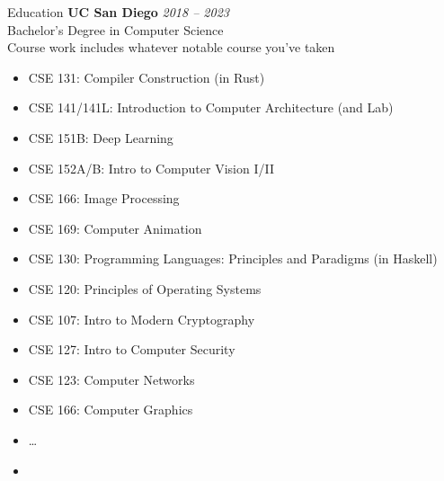 

	\begin{rSection}{Education}
		{\bf UC San Diego} \hfill {\em 2018 -- 2023} 
		\\ Bachelor's Degree in Computer Science %
		\\ Course work includes whatever notable course you've taken
		\begin{multicols}{2}
			\begin{itemize}
				\item CSE 131: Compiler Construction (in Rust)
				\item CSE 141/141L: Introduction to Computer Architecture (and Lab)
				\item CSE 151B: Deep Learning
				\item CSE 152A/B: Intro to Computer Vision I/II
				\item CSE 166: Image Processing
				\item CSE 169: Computer Animation
				\item CSE 130: Programming Languages: Principles and Paradigms (in Haskell)
				\item CSE 120: Principles of Operating Systems
				\item CSE 107: Intro to Modern Cryptography
				\item CSE 127: Intro to Computer Security
				\item CSE 123: Computer Networks
				\item CSE 166: Computer Graphics
				\item \ldots
				\item[\vspace{\fill}] %
			\end{itemize}
		\end{multicols}

	\end{rSection}
	
